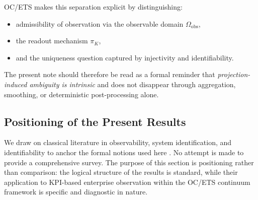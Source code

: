 OC/ETS makes this separation explicit by distinguishing:
\begin{itemize}[leftmargin=2em]
  \item admissibility of observation via the observable domain
        \(\Omega_{\mathrm{obs}}\),
  \item the readout mechanism \(\pi_K\),
  \item and the uniqueness question captured by injectivity and
        identifiability.
\end{itemize}

The present note should therefore be read as a formal reminder that
\emph{projection-induced ambiguity is intrinsic} and does not disappear through
aggregation, smoothing, or deterministic post-processing alone.

\subsection{Positioning of the Present Results}

We draw on classical literature in observability, system identification, and
identifiability to anchor the formal notions used here
\cite{kalman1960,ljung1999,walter1997}.
No attempt is made to provide a comprehensive survey.
The purpose of this section is positioning rather than comparison: the logical
structure of the results is standard, while their application to KPI-based
enterprise observation within the OC/ETS continuum framework is specific and
diagnostic in nature.
